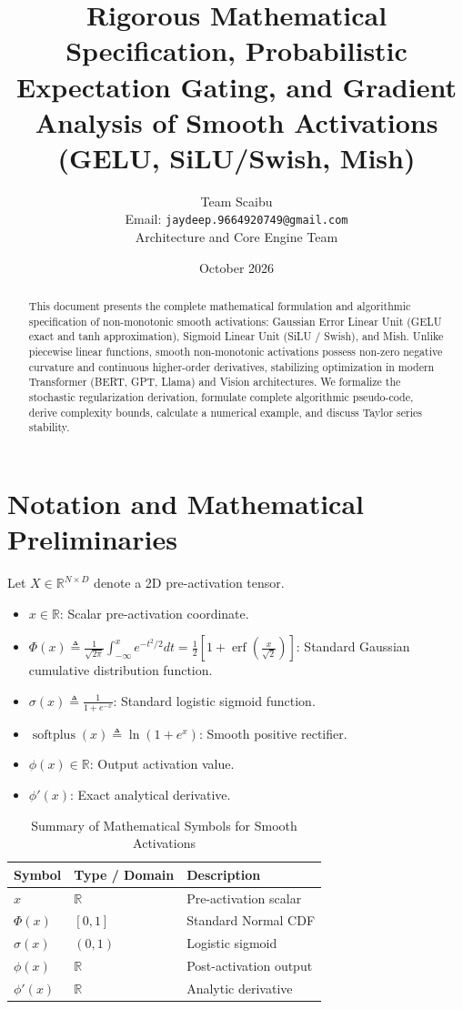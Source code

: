 \documentclass[11pt,a4paper]{article}
\title{\textbf{Rigorous Mathematical Specification, Probabilistic Expectation Gating, and Gradient Analysis of Smooth Activations (GELU, SiLU/Swish, Mish)}}
\author{Team Scaibu \\ \small Email: \texttt{jaydeep.9664920749@gmail.com} \\ \small Architecture and Core Engine Team}
\date{October 2026}
\theoremstyle{definition}
\begin{document}
\maketitle

\begin{abstract}
This document presents the complete mathematical formulation and algorithmic specification of non-monotonic smooth activations: Gaussian Error Linear Unit (GELU exact and tanh approximation), Sigmoid Linear Unit (SiLU / Swish), and Mish. Unlike piecewise linear functions, smooth non-monotonic activations possess non-zero negative curvature and continuous higher-order derivatives, stabilizing optimization in modern Transformer (BERT, GPT, Llama) and Vision architectures. We formalize the stochastic regularization derivation, formulate complete algorithmic pseudo-code, derive complexity bounds, calculate a numerical example, and discuss Taylor series stability.
\end{abstract}

\section{Notation and Mathematical Preliminaries}

Let $X \in \mathbb{R}^{N \times D}$ denote a 2D pre-activation tensor.

\begin{itemize}
    \item $x \in \mathbb{R}$: Scalar pre-activation coordinate.
    \item $\Phi(x) \triangleq \frac{1}{\sqrt{2\pi}} \int_{-\infty}^x e^{-t^2/2} dt = \frac{1}{2}\left[1 + \operatorname{erf}\left(\frac{x}{\sqrt{2}}\right)\right]$: Standard Gaussian cumulative distribution function.
    \item $\sigma(x) \triangleq \frac{1}{1 + e^{-x}}$: Standard logistic sigmoid function.
    \item $\operatorname{softplus}(x) \triangleq \ln(1 + e^x)$: Smooth positive rectifier.
    \item $\phi(x) \in \mathbb{R}$: Output activation value.
    \item $\phi'(x)$: Exact analytical derivative.
\end{itemize}

\begin{table}[h]
\centering
\caption{Summary of Mathematical Symbols for Smooth Activations}
\begin{tabular}{lll}
\toprule
\textbf{Symbol} & \textbf{Type / Domain} & \textbf{Description} \\
\midrule
$x$ & $\mathbb{R}$ & Pre-activation scalar \\
$\Phi(x)$ & $[0, 1]$ & Standard Normal CDF \\
$\sigma(x)$ & $(0, 1)$ & Logistic sigmoid \\
$\phi(x)$ & $\mathbb{R}$ & Post-activation output \\
$\phi'(x)$ & $\mathbb{R}$ & Analytic derivative \\
\bottomrule
\end{tabular}
\end{table}
\end{document}
